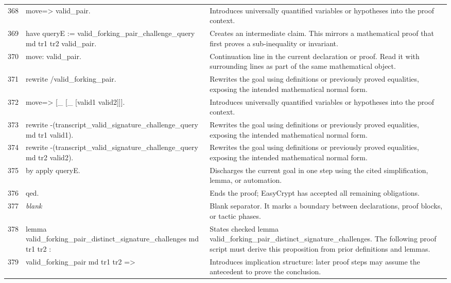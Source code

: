 \documentclass[10pt]{article}
\begin{document}
\begin{longtable}{r L{0.53\textwidth} L{0.37\textwidth}}
368 & {\ttfamily\scriptsize move=> valid\_pair.} & Introduces universally quantified variables or hypotheses into the proof context. \\
369 & {\ttfamily\scriptsize have queryE := valid\_forking\_pair\_challenge\_query md tr1 tr2 valid\_pair.} & Creates an intermediate claim.  This mirrors a mathematical proof that first proves a sub-inequality or invariant. \\
370 & {\ttfamily\scriptsize move: valid\_pair.} & Continuation line in the current declaration or proof.  Read it with surrounding lines as part of the same mathematical object. \\
371 & {\ttfamily\scriptsize rewrite /valid\_forking\_pair.} & Rewrites the goal using definitions or previously proved equalities, exposing the intended mathematical normal form. \\
372 & {\ttfamily\scriptsize move=> [\_ [\_ [valid1 valid2]]].} & Introduces universally quantified variables or hypotheses into the proof context. \\
373 & {\ttfamily\scriptsize rewrite -(transcript\_valid\_signature\_challenge\_query md tr1 valid1).} & Rewrites the goal using definitions or previously proved equalities, exposing the intended mathematical normal form. \\
374 & {\ttfamily\scriptsize rewrite -(transcript\_valid\_signature\_challenge\_query md tr2 valid2).} & Rewrites the goal using definitions or previously proved equalities, exposing the intended mathematical normal form. \\
375 & {\ttfamily\scriptsize by apply queryE.} & Discharges the current goal in one step using the cited simplification, lemma, or automation. \\
376 & {\ttfamily\scriptsize qed.} & Ends the proof; EasyCrypt has accepted all remaining obligations. \\
377 & {\ttfamily\scriptsize \emph{blank}} & Blank separator.  It marks a boundary between declarations, proof blocks, or tactic phases. \\
378 & {\ttfamily\scriptsize lemma valid\_forking\_pair\_distinct\_signature\_challenges md tr1 tr2 :} & States checked lemma valid\_forking\_pair\_distinct\_signature\_challenges.  The following proof script must derive this proposition from prior definitions and lemmas. \\
379 & {\ttfamily\scriptsize   valid\_forking\_pair md tr1 tr2 =>} & Introduces implication structure: later proof steps may assume the antecedent to prove the conclusion. \\

\end{longtable}
\end{document}
